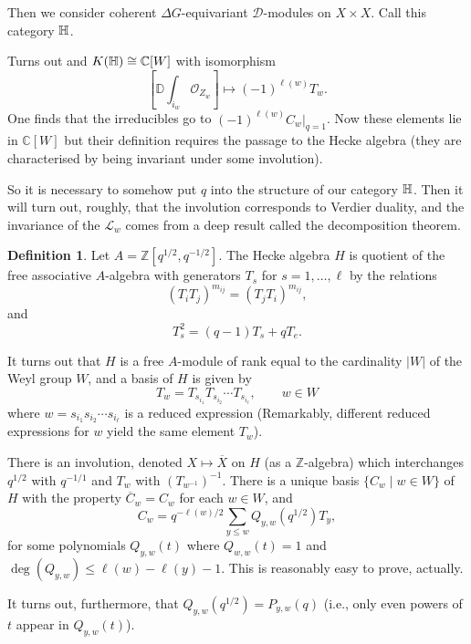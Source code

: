 \documentclass[12pt]{article}
\theoremstyle{plain}
\theoremstyle{definition}
\newtheorem{defn}{Definition}[section]
\numberwithin{equation}{section}
\newcommand{\ov}[1]{\overline#1}
\newcommand{\bbD}{\mathbb{D}}
\newcommand{\D}{\Delta}
\newcommand{\C}{\mathbb{C}}
\newcommand{\Z}{\mathbb{Z}}
\newcommand{\CD}{\mathcal{D}}
\newcommand{\CL}{\mathcal{L}}
\newcommand{\OO}{\mathcal{O}}
\begin{document}
Then we consider coherent $\D G$-equivariant $\CD$-modules on $X \times X$. Call this category $\mathbb{H}$.

Turns out {\cite[Proposition 13.1.3]{HTT}} and  $K(\heckat) \cong \C[W]$ with isomorphism
\[
[\bbD \int_{i_w}\OO_{Z_w}] \mapsto (-1)^{\ell(w)} T_w.
\]
One finds that the irreducibles go to $(-1)^{\ell(w)} C_w|_{q=1}$. Now these elements lie in $\C[W]$ but their definition requires the passage to the Hecke algebra (they are characterised by being invariant under some involution).

So it is necessary to somehow put $q$ into the structure of our category $\mathbb{H}$. Then it will turn out, roughly, that the involution corresponds to Verdier duality, and the invariance of the $\CL_w$ comes from a deep result called the decomposition theorem.



\begin{defn}
Let $A = \Z[q^{1/2}, q^{-1/2}]$. The Hecke algebra $H$ is quotient of the free associative $A$-algebra with generators $T_s$ for $s = 1, \ldots, \ell$ by the relations
\[
(T_i T_j)^{m_{ij}} = (T_j T_i)^{m_{ij}},
\]
and
\[
T_s^2 = (q-1)T_s + q T_e.
\]
\end{defn}
It turns out that $H$ is a free $A$-module of rank equal to the cardinality $|W|$ of the Weyl group $W$, and a basis of $H$ is given by
\[
T_w = T_{s_{i_1}} T_{s_{i_2}} \cdots T_{s_{i_\ell}}, \qquad w \in W
\]
where $w = s_{i_1}s_{i_2}\cdots s_{i_\ell}$ is a reduced expression (Remarkably, different reduced expressions for $w$ yield the same element $T_w$).

There is an involution, denoted $X \mapsto \ov{X}$ on $H$ (as a $\Z$-algebra) which interchanges $q^{1/2}$ with $q^{-1/1}$ and $T_w$ with $(T_{w^{-1}})^{-1}$. There is a unique basis $\{ C_{w} \mid w \in W \}$ of $H$ with the property $\ov{C_w} = C_w$ for each $w \in W$, and
\[
C_w = q^{-\ell(w)/2} \sum_{y \leq w} Q_{y, w}(q^{1/2}) T_y,
\]
for some polynomials $Q_{y, w}(t)$ where $Q_{w, w}(t) = 1$ and $\deg(Q_{y, w}) \leq \ell(w) - \ell(y) - 1$. This is reasonably easy to prove, actually.

It turns out, furthermore, that $Q_{y, w}(q^{1/2}) = P_{y, w}(q)$ (i.e., only even powers of $t$ appear in $Q_{y, w}(t)$).
\end{document}

